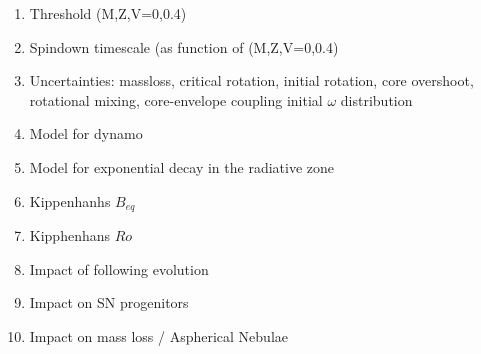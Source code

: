 \begin{enumerate}
\item Threshold (M,Z,V=0,0.4)
\item Spindown timescale (as function of (M,Z,V=0,0.4)
\item Uncertainties: massloss, critical rotation, initial rotation, core overshoot, rotational mixing, core-envelope coupling initial $\omega$ distribution  
\item Model for dynamo
\item Model for exponential decay in the radiative zone
\item Kippenhanhs $B_{eq}$
\item Kipphenhans $Ro$
\item Impact of following evolution
\item Impact on SN progenitors
\item Impact on mass loss / Aspherical Nebulae
\end{enumerate}